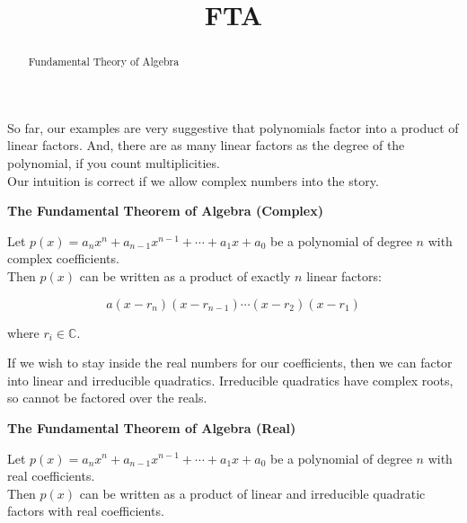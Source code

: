 \documentclass{ximera}
\title{FTA}
\begin{document}
\begin{abstract}
Fundamental Theory of Algebra
\end{abstract}
\maketitle






So far, our examples are very suggestive that polynomials factor into a product of linear factors.  And, there are as many linear factors as the degree of the polynomial, if you count multiplicities. \\



Our intuition is correct if we allow complex numbers into the story. 


\begin{theorem} \textbf{\textcolor{green!50!black}{The Fundamental Theorem of Algebra (Complex)}} 



Let $p(x) = a_n x^n + a_{n-1} x^{n-1} + \cdots + a_1 x + a_0$ be a polynomial of degree $n$ with complex coefficients. \\


Then $p(x)$ can be written as a product of exactly $n$ linear factors:

\[
 a (x - r_n) (x - r_{n-1}) \cdots (x - r_2)  (x - r_1) 
\]


where $r_i \in \mathbb{C}$.


\end{theorem}




If we wish to stay inside the real numbers for our coefficients, then we can factor into linear and irreducible quadratics.  Irreducible quadratics have complex roots, so cannot be factored over the reals.



\begin{theorem} \textbf{\textcolor{green!50!black}{The Fundamental Theorem of Algebra (Real)}} 



Let $p(x) = a_n x^n + a_{n-1} x^{n-1} + \cdots + a_1 x + a_0$ be a polynomial of degree $n$ with real coefficients. \\


Then $p(x)$ can be written as a product of linear and irreducible quadratic factors with real coefficients.


\end{theorem}
\end{document}
